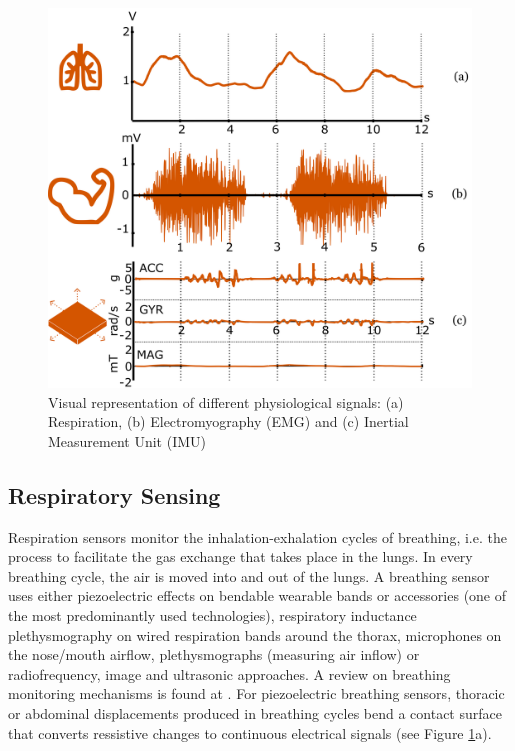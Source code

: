\begin{figure}[htbp]
\centering
\includegraphics[width=0.75\linewidth]{Chapters/Figures/preliminary_actions/biosignals_actuation/signals_abc.png}
\caption{Visual representation of different physiological signals: (a) Respiration, (b) Electromyography (EMG) and (c) Inertial Measurement Unit (IMU)}
\label{fig:biosignals_samples}
\end{figure}


\subsection*{Respiratory Sensing}
\label{sec:respiratory_sensing}

Respiration sensors monitor the inhalation-exhalation cycles of breathing, i.e. the process to facilitate the gas exchange that takes place in the lungs. In every breathing cycle, the air is moved into and out of the lungs. A breathing sensor uses either piezoelectric effects on bendable wearable bands or accessories (one of the most predominantly used technologies), respiratory inductance plethysmography on wired respiration bands around the thorax, microphones on the nose/mouth airflow, plethysmographs (measuring air inflow) or radiofrequency, image and ultrasonic approaches. A review on breathing monitoring mechanisms is found at \cite{massaroni_contact-based_2019}. For piezoelectric breathing sensors, thoracic or abdominal displacements produced in breathing cycles bend a contact surface that converts ressistive changes to continuous electrical signals
(see Figure \ref{fig:biosignals_samples}a).


